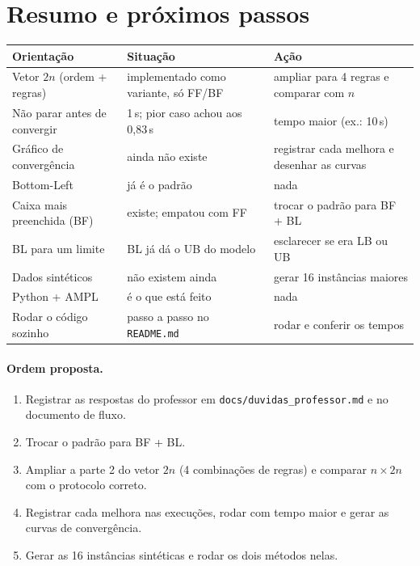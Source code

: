 \documentclass[11pt,a4paper]{article}
\begin{document}
\section{Resumo e próximos passos}
\begin{center}\small
\begin{tabular}{@{}p{4.3cm}p{5.2cm}p{6.2cm}@{}}
\toprule
Orientação & Situação & Ação \\ \midrule
Vetor $2n$ (ordem + regras) & implementado como variante, só FF/BF & ampliar para 4 regras e comparar com $n$ \\
Não parar antes de convergir & 1\,s; pior caso achou aos 0,83\,s & tempo maior (ex.: 10\,s) \\
Gráfico de convergência & ainda não existe & registrar cada melhora e desenhar as curvas \\
Bottom-Left & já é o padrão & nada \\
Caixa mais preenchida (BF) & existe; empatou com FF & trocar o padrão para BF + BL \\
BL para um limite & BL já dá o UB do modelo & esclarecer se era LB ou UB \\
Dados sintéticos & não existem ainda & gerar 16 instâncias maiores \\
Python + AMPL & é o que está feito & nada \\
Rodar o código sozinho & passo a passo no \texttt{README.md} & rodar e conferir os tempos \\
\bottomrule
\end{tabular}
\end{center}

\paragraph{Ordem proposta.}
\begin{enumerate}[leftmargin=*,itemsep=2pt]
\item Registrar as respostas do professor em \texttt{docs/duvidas\_professor.md} e no documento de fluxo.
\item Trocar o padrão para BF + BL.
\item Ampliar a parte 2 do vetor $2n$ (4 combinações de regras) e comparar $n\times2n$ com o protocolo correto.
\item Registrar cada melhora nas execuções, rodar com tempo maior e gerar as curvas de convergência.
\item Gerar as 16 instâncias sintéticas e rodar os dois métodos nelas.
\end{enumerate}
\end{document}
